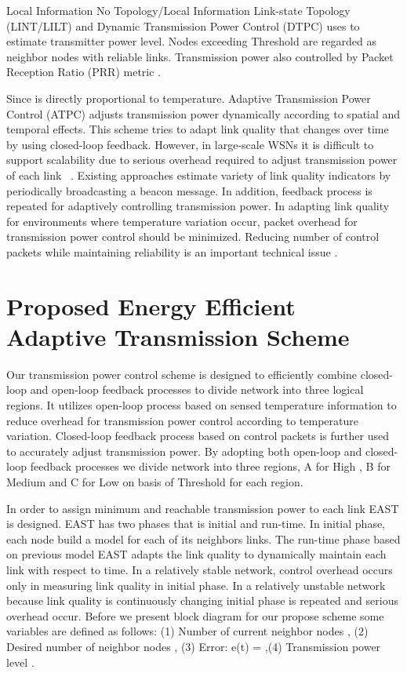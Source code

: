 \documentclass{article}
\begin{document}
Local Information No Topology/Local Information Link-state Topology (LINT/LILT) and Dynamic Transmission Power Control (DTPC) uses  to estimate transmitter power level. Nodes exceeding Threshold   are regarded as neighbor nodes with reliable links. Transmission power also controlled by Packet Reception Ratio (PRR) metric \cite{3}.


Since  is directly proportional to temperature. Adaptive Transmission Power Control (ATPC) adjusts transmission power dynamically according to spatial and temporal effects. This scheme tries to adapt link quality that changes over time by using closed-loop feedback. However, in large-scale WSNs it is difficult to support scalability due to serious overhead required to adjust transmission power of each link ~\cite{4}. Existing approaches estimate variety of link quality indicators by periodically broadcasting a beacon message. In addition, feedback process is repeated for adaptively controlling transmission power. In adapting link quality for environments where temperature variation occur, packet overhead for transmission power control should be minimized. Reducing number of control packets while maintaining reliability is an important technical issue \cite{5}.

\section{Proposed Energy Efficient Adaptive Transmission Scheme}
\label{sec:pagestyle}

Our transmission power control scheme is designed to efficiently combine closed-loop and open-loop feedback processes to divide network into three logical regions. It utilizes open-loop process based on sensed temperature information to reduce overhead for transmission power control according to temperature variation. Closed-loop feedback process based on control packets is further used to accurately adjust transmission power. By adopting both open-loop and closed-loop feedback processes we divide network into three regions, A for High , B for Medium  and  C for Low   on basis of Threshold   for each region.

In order to assign minimum and reachable transmission power to each link EAST is designed. EAST has two phases that is initial and run-time. In initial phase, each node build a model for each of its neighbors links. The run-time phase based on previous model EAST adapts the link quality to dynamically maintain each link with respect to time. In a relatively stable network, control overhead occurs only in measuring link quality in initial phase. In a relatively unstable network because link quality is continuously changing initial phase is repeated and serious overhead occur. Before we present block diagram for our propose scheme some variables are defined as follows: (1) Number of current neighbor nodes , (2) Desired number of neighbor nodes , (3) Error: e(t) = ,(4) Transmission power level .
\end{document}
